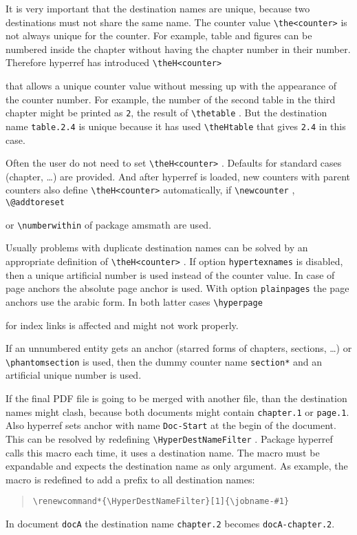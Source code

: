 \documentclass[pdftex]{article}
\newcommand*{\cs}[1]{%
  \texttt{\textbackslash #1}%
}
\newcommand*{\xpackage}[1]{\textsf{#1}}
\begin{document}
It is very important that the destination names are unique,
because two destinations must not share the same name.
The counter value \cs{the<counter>} is not always unique
for the counter. For example, table and figures can be numbered
inside the chapter without having the chapter number in their
number. Therefore \xpackage{hyperref} has introduced \cs{theH<counter>}
that allows a unique counter value without messing up with
the appearance of the counter number. For example, the number
of the second table in the third chapter might be printed
as \texttt{2}, the result of \cs{thetable}. But the
destination name \texttt{table.2.4} is unique because it
has used \cs{theHtable} that gives \verb|2.4| in this case.

Often the user do not need to set \cs{theH<counter>}. Defaults
for standard cases (chapter, \dots) are provided. And after \xpackage{hyperref}
is loaded, new counters with parent counters also define
\cs{theH<counter>} automatically, if \cs{newcounter}, \cs{@addtoreset}
or \cs{numberwithin} of package \xpackage{amsmath} are used.

Usually problems with duplicate destination names can be solved
by an appropriate definition of \cs{theH<counter>}. If option
\texttt{hypertexnames} is disabled, then a unique artificial
number is used instead of the counter value. In case of page
anchors the absolute page anchor is used. With option \texttt{plainpages}
the page anchors use the arabic form. In both latter cases \cs{hyperpage}
for index links is affected and might not work properly.

If an unnumbered entity gets an anchor (starred forms of
chapters, sections, \dots) or \cs{phantomsection} is used,
then the dummy counter name \texttt{section*} and an artificial
unique number is used.

If the final PDF file is going to be merged with another file, than
the destination names might clash, because both documents might
contain \texttt{chapter.1} or \texttt{page.1}. Also \xpackage{hyperref}
sets anchor with name \texttt{Doc-Start} at the begin of the document.
This can be resolved by redefining \cs{HyperDestNameFilter}.
Package \xpackage{hyperref} calls this macro each time, it uses a
destination name.
The macro must be expandable and expects the destination name
as only argument. As example, the macro is redefined to add
a prefix to all destination names:
\begin{quote}
\begin{verbatim}
\renewcommand*{\HyperDestNameFilter}[1]{\jobname-#1}
\end{verbatim}
\end{quote}
In document \texttt{docA} the destination name \texttt{chapter.2}
becomes \texttt{docA-chapter.2}.
\end{document}
